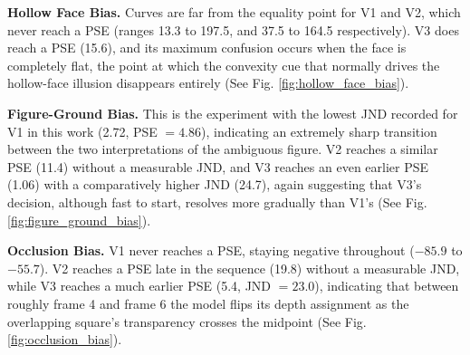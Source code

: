 \documentclass[10pt,twocolumn]{article}
\begin{document}
\textbf{Hollow Face Bias.} Curves are far from the equality point for V1 and V2, which
never reach a PSE (ranges 13.3 to 197.5, and 37.5 to 164.5 respectively). V3 does reach a
PSE (15.6), and its maximum confusion occurs when the face is completely flat, the point
at which the convexity cue that normally drives the hollow-face illusion disappears
entirely (See Fig. \ref{fig:hollow_face_bias}).

\textbf{Figure-Ground Bias.} This is the experiment with the lowest JND recorded for V1
in this work (2.72, PSE $=4.86$), indicating an extremely sharp transition between the
two interpretations of the ambiguous figure. V2 reaches a similar PSE (11.4) without a
measurable JND, and V3 reaches an even earlier PSE (1.06) with a comparatively higher
JND (24.7), again suggesting that V3's decision, although fast to start, resolves more
gradually than V1's (See Fig. \ref{fig:figure_ground_bias}). \newline

\textbf{Occlusion Bias.} V1 never reaches a PSE, staying negative throughout ($-85.9$ to
$-55.7$). V2 reaches a PSE late in the sequence (19.8) without a measurable JND, while V3
reaches a much earlier PSE (5.4, JND $=23.0$), indicating that between roughly frame 4
and frame 6 the model flips its depth assignment as the overlapping square's transparency
crosses the midpoint (See Fig. \ref{fig:occlusion_bias}).
\end{document}
